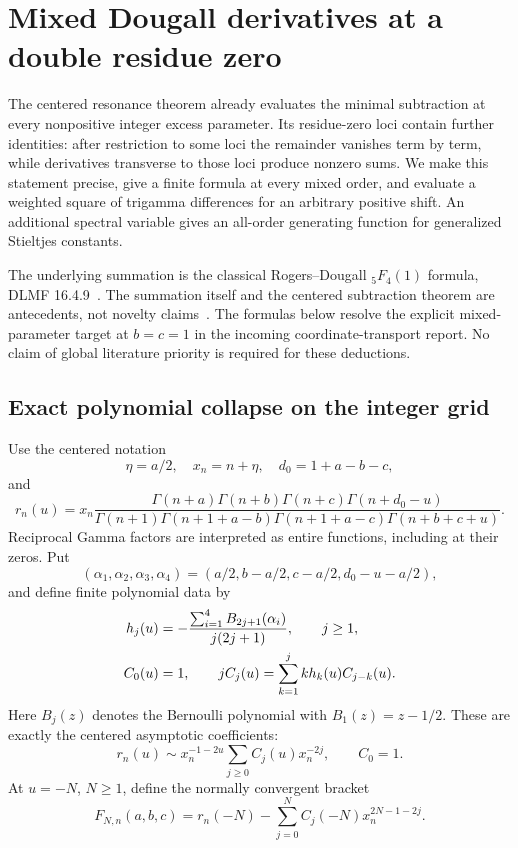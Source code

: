 \section{Mixed Dougall derivatives at a double residue zero}
\label{dg:section}

The centered resonance theorem already evaluates the minimal
subtraction at every nonpositive integer excess parameter. Its
residue-zero loci contain further identities: after restriction to
some loci the remainder vanishes term by term, while derivatives
transverse to those loci produce nonzero sums. We make this statement
precise, give a finite formula at every mixed order, and evaluate a
weighted square of trigamma differences for an arbitrary positive
shift. An additional spectral variable gives an all-order generating
function for generalized Stieltjes constants.

The underlying summation is the classical Rogers--Dougall
${}_5F_4(1)$ formula, DLMF 16.4.9~\cite{DLMFDougall}. The summation itself and the
centered subtraction theorem are antecedents, not novelty claims~\cite{RepoDougall,RepoTransport}.
The formulas below resolve the explicit mixed-parameter target
at $b=c=1$ in the incoming coordinate-transport report. No claim of
global literature priority is required for these deductions.

\subsection{Exact polynomial collapse on the integer grid}

Use the centered notation
\[
 \eta=a/2,\quad x_n=n+\eta,\quad d_0=1+a-b-c,
\]
and
\[
 r_n(u)=x_n\frac{\Gamma(n+a)\Gamma(n+b)\Gamma(n+c)
                     \Gamma(n+d_0-u)}
 {\Gamma(n+1)\Gamma(n+1+a-b)\Gamma(n+1+a-c)
                     \Gamma(n+b+c+u)}.
\]
Reciprocal Gamma factors are interpreted as entire functions, including
at their zeros. Put
\[
 (\alpha_1,\alpha_2,\alpha_3,\alpha_4)
       =(a/2,b-a/2,c-a/2,d_0-u-a/2),
\]
and define finite polynomial data by
\begin{align}
 h_j(u)&=-\frac{\sum_{i=1}^4B_{2j+1}(\alpha_i)}{j(2j+1)},\qquad j\geq1,
       \notag\\
 C_0(u)&=1,\qquad
 jC_j(u)=\sum_{k=1}^jkh_k(u)C_{j-k}(u).
 \label{dg:centered-recurrence}
\end{align}
Here $B_j(z)$ denotes the Bernoulli polynomial with $B_1(z)=z-1/2$.
These are exactly the centered asymptotic coefficients:
\[
 r_n(u)\sim x_n^{-1-2u}\sum_{j\geq0}C_j(u)x_n^{-2j},\qquad C_0=1.
\]
At $u=-N$, $N\geq1$, define the normally convergent bracket
\[
 F_{N,n}(a,b,c)=r_n(-N)-\sum_{j=0}^N C_j(-N)x_n^{2N-1-2j}.
\]

